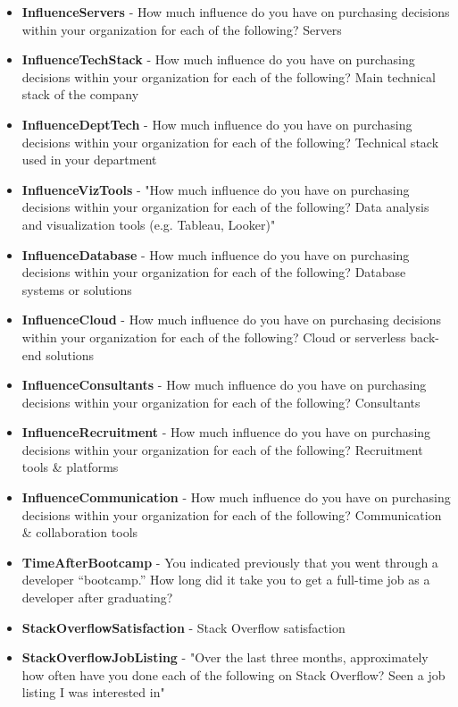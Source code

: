 \begin{appendices}
\begin{itemize}
        \item \textbf{InfluenceServers} - How much influence do you have on purchasing decisions within your organization for each of the following? Servers
        \item \textbf{InfluenceTechStack} - How much influence do you have on purchasing decisions within your organization for each of the following? Main technical stack of the company
        \item \textbf{InfluenceDeptTech} - How much influence do you have on purchasing decisions within your organization for each of the following? Technical stack used in your department
        \item \textbf{InfluenceVizTools} - "How much influence do you have on purchasing decisions within your organization for each of the following? Data analysis and visualization tools (e.g. Tableau, Looker)"
        \item \textbf{InfluenceDatabase} - How much influence do you have on purchasing decisions within your organization for each of the following? Database systems or solutions
        \item \textbf{InfluenceCloud} - How much influence do you have on purchasing decisions within your organization for each of the following? Cloud or serverless back-end solutions
        \item \textbf{InfluenceConsultants} - How much influence do you have on purchasing decisions within your organization for each of the following? Consultants
        \item \textbf{InfluenceRecruitment} - How much influence do you have on purchasing decisions within your organization for each of the following? Recruitment tools & platforms
        \item \textbf{InfluenceCommunication} - How much influence do you have on purchasing decisions within your organization for each of the following? Communication & collaboration tools
        \item \textbf{TimeAfterBootcamp} - You indicated previously that you went through a developer “bootcamp.” How long did it take you to get a full-time job as a developer after graduating?
        \item \textbf{StackOverflowSatisfaction} - Stack Overflow satisfaction
        \item \textbf{StackOverflowJobListing} - "Over the last three months, approximately how often have you done each of the following on Stack Overflow? Seen a job listing I was interested in"

\end{itemize}
\end{appendices}
